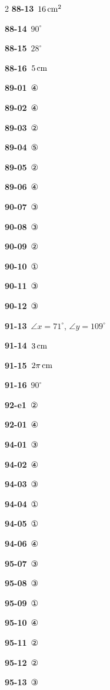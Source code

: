 \documentclass[10pt,a4paper]{article}
\begin{document}
\begin{multicols}{2}
\noindent\textbf{88-13}\ $16\mkern3mu \mathrm{cm}^2$\par
\noindent\textbf{88-14}\ $90^\circ$\par
\noindent\textbf{88-15}\ $28^\circ$\par
\noindent\textbf{88-16}\ $5\mkern3mu \mathrm{cm}$\par
\noindent\textbf{89-01}\ ④\par
\noindent\textbf{89-02}\ ④\par
\noindent\textbf{89-03}\ ②\par
\noindent\textbf{89-04}\ ⑤\par
\noindent\textbf{89-05}\ ②\par
\noindent\textbf{89-06}\ ④\par
\noindent\textbf{90-07}\ ③\par
\noindent\textbf{90-08}\ ③\par
\noindent\textbf{90-09}\ ②\par
\noindent\textbf{90-10}\ ①\par
\noindent\textbf{90-11}\ ③\par
\noindent\textbf{90-12}\ ③\par
\noindent\textbf{91-13}\ $\angle x=71^\circ$, $\angle y=109^\circ$\par
\noindent\textbf{91-14}\ $3\mkern3mu \mathrm{cm}$\par
\noindent\textbf{91-15}\ $2\pi\mkern3mu \mathrm{cm}$\par
\noindent\textbf{91-16}\ $90^\circ$\par
\noindent\textbf{92-e1}\ ②\par
\noindent\textbf{92-01}\ ④\par
\noindent\textbf{94-01}\ ③\par
\noindent\textbf{94-02}\ ④\par
\noindent\textbf{94-03}\ ③\par
\noindent\textbf{94-04}\ ①\par
\noindent\textbf{94-05}\ ①\par
\noindent\textbf{94-06}\ ④\par
\noindent\textbf{95-07}\ ③\par
\noindent\textbf{95-08}\ ③\par
\noindent\textbf{95-09}\ ①\par
\noindent\textbf{95-10}\ ④\par
\noindent\textbf{95-11}\ ②\par
\noindent\textbf{95-12}\ ②\par
\noindent\textbf{95-13}\ ③\par

\end{multicols}
\end{document}
